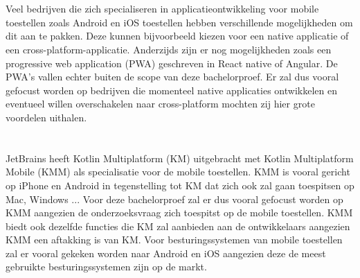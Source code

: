 \section{}
\label{sec:probleemstelling}

Veel bedrijven die zich specialiseren in applicatieontwikkeling voor mobile toestellen zoals Android en iOS toestellen hebben verschillende mogelijkheden om dit aan te pakken. Deze kunnen bijvoorbeeld kiezen voor een native applicatie of een cross-platform-applicatie. Anderzijds zijn er nog mogelijkheden zoals een progressive web application (PWA) geschreven in React native of Angular. De PWA's vallen echter buiten de scope van deze bachelorproef. Er zal dus vooral gefocust worden op bedrijven die momenteel native applicaties ontwikkelen en eventueel willen overschakelen naar cross-platform mochten zij hier grote voordelen uithalen.



\section{}
\label{sec:afbakening}

JetBrains heeft Kotlin Multiplatform (KM) uitgebracht met Kotlin Multiplatform Mobile (KMM) als specialisatie voor de mobile toestellen. KMM is  vooral gericht op iPhone en Android in tegenstelling tot KM dat zich ook zal gaan toespitsen op Mac, Windows ... Voor deze bachelorproef zal er dus vooral gefocust worden op KMM aangezien de onderzoeksvraag zich toespitst op de mobile toestellen. KMM biedt ook dezelfde functies die KM zal aanbieden aan de ontwikkelaars aangezien KMM een aftakking is van KM. Voor besturingssystemen van mobile toestellen zal er vooral gekeken worden naar Android en iOS aangezien deze de meest gebruikte besturingssystemen zijn op de markt.


